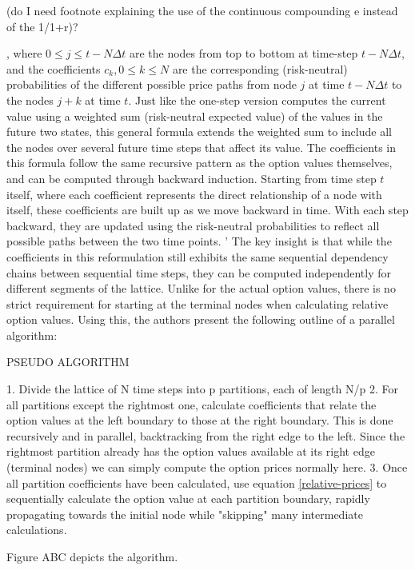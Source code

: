 \documentclass[english,12pt,a4paper,pdftex,sci,utf8]{aaltothesis}
\begin{document}
(do I need footnote explaining the use of the continuous compounding e instead of the 1/1+r)?


, where $0 \leq j \leq t-N\Delta t$ are the nodes from top to bottom at time-step $t - N\Delta t$, and the coefficients $c_k, 0 \leq k \leq N$ are the corresponding (risk-neutral) probabilities of the different possible price paths from node $j$ at time $t-N\Delta t$ to the nodes $j+k$ at time $t$. Just like the one-step version computes the current value using a weighted sum (risk-neutral expected value) of the values in the future two states, this general formula extends the weighted sum to include all the nodes over several future time steps that affect its value. The coefficients in this formula follow the same recursive pattern as the option values themselves, and can be computed through backward induction. Starting from time step $t$ itself, where each coefficient represents the direct relationship of a node with itself, these coefficients are built up as we move backward in time. With each step backward, they are updated using the risk-neutral probabilities to reflect all possible paths between the two time points.
'
The key insight is that while the coefficients in this reformulation still exhibits the same sequential dependency chains between sequential time steps, they can be computed independently for different segments of the lattice. Unlike for the actual option values, there is no strict requirement for starting at the terminal nodes when calculating relative option values. Using this, the authors present the following outline of a parallel algorithm:

PSEUDO ALGORITHM

1. Divide the lattice of N time steps into p partitions, each of length N/p
2. For all partitions except the rightmost one, calculate coefficients that relate the option values at the left boundary to those at the right boundary. This is done recursively and in parallel, backtracking from the right edge to the left. Since the rightmost partition already has the option values available at its right edge (terminal nodes) we can simply compute the option prices normally here.
3. Once all partition coefficients have been calculated, use equation \eqref{relative-prices} to sequentially calculate the option value at each partition boundary, rapidly propagating towards the initial node while "skipping" many intermediate calculations.

Figure ABC depicts the algorithm.
\end{document}
